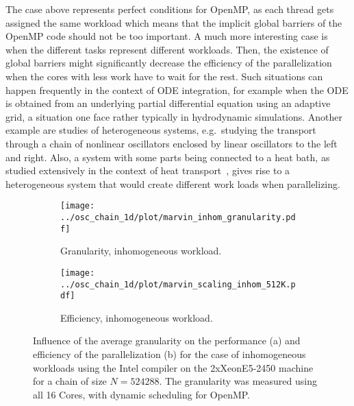 \documentclass[10pt]{elsarticle}
\begin{document}
The case above represents perfect conditions for OpenMP, as each thread gets assigned the same workload which means that the implicit global barriers of the OpenMP code should not be too important.
A much more interesting case is when the different tasks represent different workloads.
Then, the existence of global barriers might significantly decrease the efficiency of the parallelization when the cores with less work have to wait for the rest.
Such situations can happen frequently in the context of ODE integration, for example when the ODE is obtained from an underlying partial differential equation using an adaptive grid, a situation one face rather typically in hydrodynamic simulations.
Another example are studies of heterogeneous systems, e.g.\ studying the transport through a chain of nonlinear oscillators enclosed by linear oscillators to the left and right.
Also, a system with some parts being connected to a heat bath, as studied extensively in the context of heat transport~\cite{Lepri_Livi_Politi_03}, gives rise to a heterogeneous system that would create different work loads when parallelizing.

\begin{figure}
 \begin{subfigure}[b]{0.49\textwidth}
  \centering
  \texttt{[image: ../osc\_chain\_1d/plot/marvin\_inhom\_granularity.pdf]}\hfill
  \caption{Granularity, inhomogeneous workload.} 
  \label{fig:inhom_granularity}
 \end{subfigure}
 \begin{subfigure}[b]{0.49\textwidth}
  \centering
  \texttt{[image: ../osc\_chain\_1d/plot/marvin\_scaling\_inhom\_512K.pdf]}\hfill
  \caption{Efficiency, inhomogeneous workload.} 
  \label{fig:inhom_512K}
 \end{subfigure}
 \caption{Influence of the average granularity on the performance (a) and efficiency of the parallelization (b) for the case of inhomogeneous workloads using the Intel compiler on the 2xXeonE5-2450 machine for a chain of size $N=524288$. The granularity was measured using all 16 Cores, with dynamic scheduling for OpenMP.}
 \label{fig:inhom_1}
\end{figure}
\end{document}
